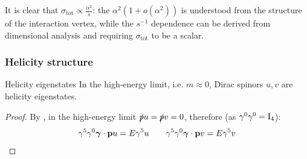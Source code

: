 It is clear that $ \sigma_\text{tot} \propto \frac{\alpha^2}{s} $: the $ \alpha^2 \left( 1 + o(\alpha^2) \right) $ is understood from the structure of the interaction vertex, while the $ s^{-1} $ dependence can be derived from dimensional analysis and requiring $ \sigma_\text{tot} $ to be a scalar.

\subsubsection{Helicity structure}

\begin{proposition}{Helicity eigenstates}{}
  In the high-energy limit, i.e. $ m \approx 0 $, Dirac spinors $ u,v $ are helicity eigenstates.
\end{proposition}

\begin{proofbox}
  \begin{proof}
    By , in the high-energy limit $ \slashed{p} u = \slashed{p} v = 0 $, therefore (as $ \gamma^0 \gamma^0 = \mathrm{I}_4 $):
    \begin{equation*}
      \gamma^5 \gamma^0 \boldsymbol{\gamma} \cdot \mathbf{p} u = E \gamma^5 u
      \qquad
      \gamma^5 \gamma^0 \boldsymbol{\gamma} \cdot \mathbf{p} v = E \gamma^5 v
    \end{equation*}
  \end{proof}
\end{proofbox}










